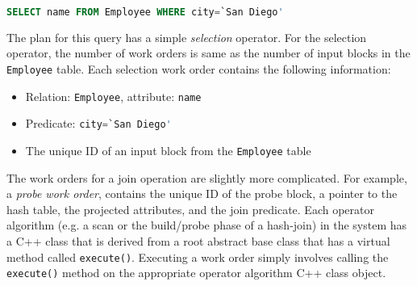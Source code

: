 \begin{lstlisting}[language=SQL, 
basicstyle=\ttfamily\small, 
showstringspaces=false,
keywordstyle=\color{cardinal}\bfseries, 
emph={San,Diego}, 
emphstyle=\color{bondiblue}\bfseries]
SELECT name FROM Employee WHERE city=`San Diego'
\end{lstlisting}	

The plan for this query has a simple \textit{selection} operator.  
For the selection operator, the number of work orders is same as the number of input blocks in the \verb+Employee+ table. 
Each selection work order contains the following information:
\begin{itemize}
	\item {Relation: \verb+Employee+, attribute: \verb|name|}
	\item {Predicate: \lstinline[language=SQL, 
		basicstyle=\ttfamily\small, 
		keywordstyle=\color{cardinal} \bfseries,
		emph={San,Diego}, 
		emphstyle=\color{bondiblue}\bfseries]|city=`San Diego'|}
	\item {The unique ID of an input block from the \verb+Employee+ table}
\end{itemize}

The work orders for a join operation %
are slightly more complicated. 
For example, a \textit{probe work order},  contains the unique ID of the probe 
block, %
a pointer to the hash table, the projected attributes, and the join predicate.
Each operator algorithm (e.g. a scan or the build/probe phase of a hash-join) 
in the system has a C++ class that is derived from a root abstract base class that has a virtual method called \verb|execute()|.
Executing a work order simply involves calling the \verb|execute()| method 
on the appropriate operator algorithm C++ class object. 
